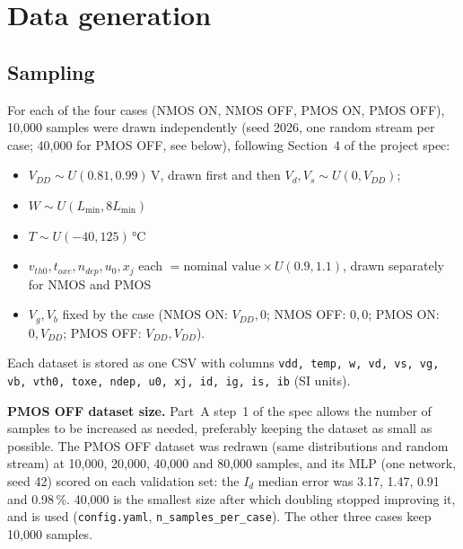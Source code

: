 \documentclass[11pt,a4paper]{article}
\begin{document}
\section{Data generation}

\subsection{Sampling}
For each of the four cases (NMOS ON, NMOS OFF, PMOS ON, PMOS OFF), 10,000 samples were drawn
independently (seed 2026, one random stream per case; 40,000 for PMOS OFF, see below), following Section~4
of the project spec:
\begin{itemize}
  \item $V_{DD} \sim U(0.81, 0.99)$\,V, drawn first and then $V_d, V_s \sim U(0, V_{DD})$;
  \item $W \sim U(L_{\min}, 8L_{\min})$
  \item $T \sim U(-40, 125)$\,\si{\celsius}
  \item $v_{th0}, t_{oxe}, n_{dep}, u_0, x_j$ each $= \text{nominal value}\times U(0.9, 1.1)$, drawn separately for NMOS and PMOS
  \item $V_g, V_b$ fixed by the case (NMOS ON: $V_{DD}, 0$; NMOS OFF: $0, 0$; PMOS ON: $0, V_{DD}$; PMOS OFF: $V_{DD}, V_{DD}$).
\end{itemize}
Each dataset is stored as one CSV with columns
\texttt{vdd, temp, w, vd, vs, vg, vb, vth0, toxe, ndep, u0, xj, id, ig, is, ib} (SI units).

\textbf{PMOS OFF dataset size.} Part~A step~1 of the spec allows the number of samples to be increased as
needed, preferably keeping the dataset as small as possible. The PMOS OFF dataset was redrawn (same
distributions and random stream) at 10,000, 20,000, 40,000 and 80,000 samples, and its MLP (one network,
seed 42) scored on each validation set: the $I_d$ median error was 3.17, 1.47, 0.91 and 0.98\,\%. 40,000 is
the smallest size after which doubling stopped improving it, and is used (\texttt{config.yaml},
\texttt{n\_samples\_per\_case}). The other three cases keep 10,000 samples.
\end{document}
